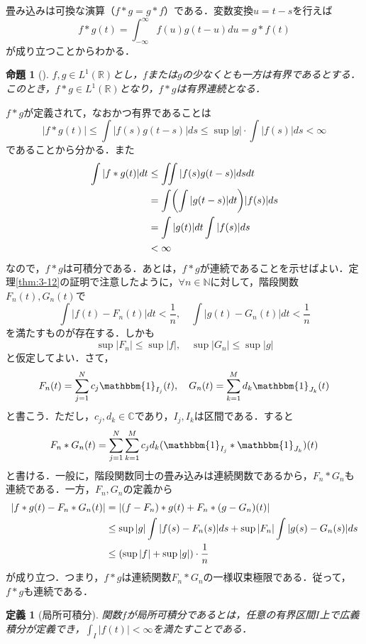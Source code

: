 \documentclass[dvipdfmx,a4j,10pt]{jsarticle}
\makeatletter
\theoremstyle{mystyle1}
\newtheorem{proposition}[theorem]{命題}
\theoremstyle{mystyle3}
\theoremstyle{mystyle4}
\theoremstyle{mystyle6}
\theoremstyle{mystyle2}
\newtheorem{dfn*}{定義}
\theoremstyle{mystyle5}
\renewenvironment{proof}[1][\proofname]{\par
  \pushQED{\qed}%
  \normalfont
  \topsep6\p@\@plus6\p@ \trivlist
  \item[\hskip\labelsep{\bfseries\sffamily #1}]\ignorespaces
}{%
  \popQED\endtrivlist\@endpefalse
}
\renewcommand\proofname{証明}
\newenvironment{prop}[1][]
{\begin{tcolorbox}[
    enhanced,
    boxrule=0pt,
    arc=0mm,
    frame hidden,
    borderline west={2pt}{-4pt}{blue!50!black},
    breakable = true
    ]
    \begin{proposition}[#1]
}
{\end{proposition}\end{tcolorbox}}
\makeatother
\begin{document}
畳み込みは可換な演算（$f*g=g*f$）である．変数変換$u=t-s$を行えば
\[
	f*g(t)=\int_{-\infty}^\infty f(u)g(t-u)du=g*f(t)
\]
が成り立つことからわかる．

\begin{prop}\label{prop:3-13}
	$f, g\in L^1(\mathbb{R})$とし，$f$または$g$の少なくとも一方は有界であるとする．このとき，$f*g\in L^1(\mathbb{R})$となり，$f*g$は有界連続となる．
\end{prop}

\begin{proof}
	$f*g$が定義されて，なおかつ有界であることは
	\[
		|f*g(t)|\leq\int|f(s)g(t-s)|ds\leq\sup|g|\cdot\int|f(s)|ds<\infty
	\]
	であることから分かる．また
	\[
		\begin{split}
			\int|f*g(t)|dt&\leq\iint|f(s)g(t-s)|dsdt \\
			&=\int\mleft(\int|g(t-s)|dt\mright)|f(s)|ds \\
			&=\int|g(t)|dt\int|f(s)|ds \\
			&<\infty
		\end{split}
	\]
	なので，$f*g$は可積分である．あとは，$f*g$が連続であることを示せばよい．定理\ref{thm:3-12}の証明で注意したように，$\forall n\in\mathbb{N}$に対して，階段関数$F_n(t), G_n(t)$で
	\[
		\int|f(t)-F_n(t)|dt<\frac{1}{n},\quad\int|g(t)-G_n(t)|dt<\frac{1}{n}
	\]
	を満たすものが存在する．しかも
	\[
		\sup|F_n|\leq\sup|f|,\quad\sup|G_n|\leq\sup|g|
	\]
	と仮定してよい．さて，
	\[
		F_n(t)=\sum_{j=1}^N c_j\mathbbm{1}_{I_j}(t),\quad G_n(t)=\sum_{k=1}^M d_k\mathbbm{1}_{J_k}(t)
	\]
	と書こう．ただし，$c_j, d_k\in\mathbb{C}$であり，$I_j, I_k$は区間である．すると
	\[
		F_n*G_n(t)=\sum_{j=1}^N\sum_{k=1}^M c_jd_k(\mathbbm{1}_{I_j}*\mathbbm{1}_{J_k})(t)
	\]
	と書ける．一般に，階段関数同士の畳み込みは連続関数であるから，$F_n*G_n$も連続である．一方，$F_n, G_n$の定義から
	\[
		\begin{split}
			|f*g(t)-F_n*G_n(t)|&=|(f-F_n)*g(t)+F_n*(g-G_n)(t)| \\
			&\leq\sup|g|\int|f(s)-F_n(s)|ds+\sup|F_n|\int|g(s)-G_n(s)|ds \\
			&\leq\mleft(\sup|f|+\sup|g|\mright)\cdot\frac{1}{n}
		\end{split}
	\]
	が成り立つ．つまり，$f*g$は連続関数$F_n*G_n$の一様収束極限である．従って，$f*g$も連続である．
\end{proof}

\begin{dfn*}[局所可積分]
	関数$f$が局所可積分であるとは，任意の有界区間$I$上で広義積分が定義でき，$\int_I |f(t)|<\infty$を満たすことである．
\end{dfn*}
\end{document}

